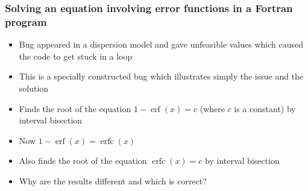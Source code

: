 \documentclass{beamer}
\DeclareMathOperator{\erf}{erf}
\DeclareMathOperator{\erfc}{erfc}
\begin{document}
\begin{frame}
\frametitle{Solving an equation involving error functions in a Fortran program}
\begin{itemize}
\item Bug appeared in a dispersion model and gave unfeasible values which caused
the code to get stuck in a loop
\item This is a specially constructed bug which illustrates simply the issue and
the solution
\item Finds the root of the equation $1-\erf(x) = c$ (where $c$ is a constant)
by interval bisection
\item Now $1-\erf(x) = \erfc(x)$
\item Also finds the root of the equation $\erfc(x) = c$ by interval bisection
\item Why are the results different and which is correct?
\end{itemize}
\end{frame}
\end{document}
